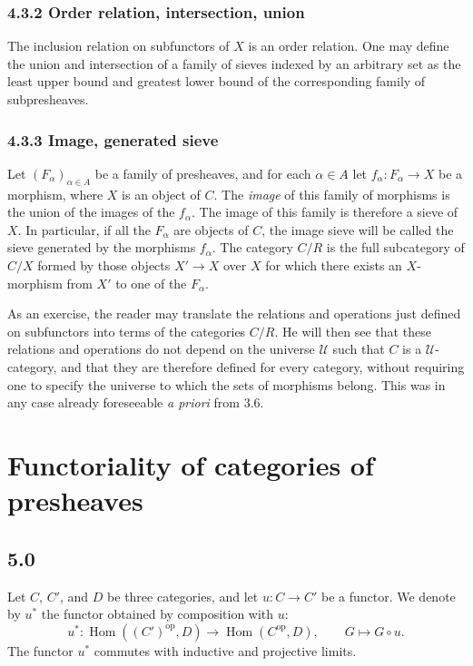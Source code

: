 \documentclass[11pt]{article}
\newcommand{\U}{\mathcal{U}}
\newcommand{\op}{\mathrm{op}}
\newcommand{\Hhom}{\operatorname{Hom}}
\begin{document}
\subsubsection*{4.3.2 Order relation, intersection, union}
The inclusion relation on subfunctors of $X$ is an order relation. One may define the union and intersection of a family of sieves indexed by an arbitrary set as the least upper bound and greatest lower bound of the corresponding family of subpresheaves.

\subsubsection*{4.3.3 Image, generated sieve}
Let $(F_\alpha)_{\alpha\in A}$ be a family of presheaves, and for each $\alpha\in A$ let $f_\alpha:F_\alpha\to X$ be a morphism, where $X$ is an object of $C$. The \emph{image} of this family of morphisms is the union of the images of the $f_\alpha$. The image of this family is therefore a sieve of $X$. In particular, if all the $F_\alpha$ are objects of $C$, the image sieve will be called the sieve generated by the morphisms $f_\alpha$. The category $C/R$ is the full subcategory of $C/X$ formed by those objects $X'\to X$ over $X$ for which there exists an $X$-morphism from $X'$ to one of the $F_\alpha$.

As an exercise, the reader may translate the relations and operations just defined on subfunctors into terms of the categories $C/R$. He will then see that these relations and operations do not depend on the universe $\U$ such that $C$ is a $\U$-category, and that they are therefore defined for every category, without requiring one to specify the universe to which the sets of morphisms belong. This was in any case already foreseeable \emph{a priori} from 3.6.

\section{Functoriality of categories of presheaves}

\subsection*{5.0}
Let $C$, $C'$, and $D$ be three categories, and let $u:C\to C'$ be a functor. We denote by $u^*$ the functor obtained by composition with $u$:
\[
u^*: \Hhom((C')^{\op},D)\longrightarrow \Hhom(C^{\op},D),\qquad G\longmapsto G\circ u.
\]
The functor $u^*$ commutes with inductive and projective limits.
\end{document}
